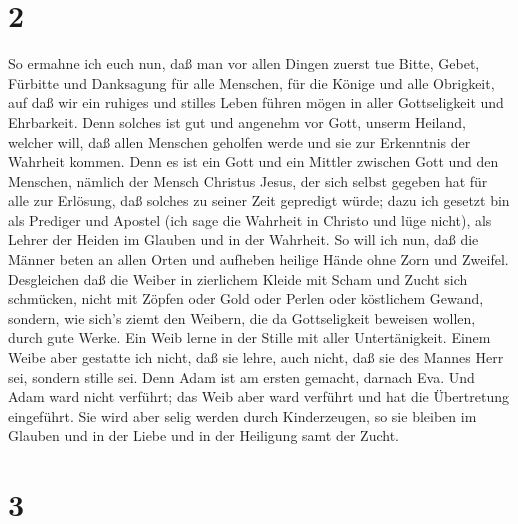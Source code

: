 \hypertarget{section-1}{%
\section{2}\label{section-1}}

 So ermahne ich euch nun, daß man vor allen Dingen zuerst
tue Bitte, Gebet, Fürbitte und Danksagung für alle Menschen,
 für die Könige und alle Obrigkeit, auf daß wir ein ruhiges
und stilles Leben führen mögen in aller Gottseligkeit und Ehrbarkeit.
 Denn solches ist gut und angenehm vor Gott, unserm Heiland,
 welcher will, daß allen Menschen geholfen werde und sie zur
Erkenntnis der Wahrheit kommen.  Denn es ist ein Gott und
ein Mittler zwischen Gott und den Menschen, nämlich der Mensch Christus
Jesus,  der sich selbst gegeben hat für alle zur Erlösung,
daß solches zu seiner Zeit gepredigt würde;  dazu ich
gesetzt bin als Prediger und Apostel (ich sage die Wahrheit in Christo
und lüge nicht), als Lehrer der Heiden im Glauben und in der Wahrheit.
 So will ich nun, daß die Männer beten an allen Orten und
aufheben heilige Hände ohne Zorn und Zweifel.  Desgleichen
daß die Weiber in zierlichem Kleide mit Scham und Zucht sich schmücken,
nicht mit Zöpfen oder Gold oder Perlen oder köstlichem Gewand,
 sondern, wie sich's ziemt den Weibern, die da
Gottseligkeit beweisen wollen, durch gute Werke.  Ein Weib
lerne in der Stille mit aller Untertänigkeit.  Einem Weibe
aber gestatte ich nicht, daß sie lehre, auch nicht, daß sie des Mannes
Herr sei, sondern stille sei.  Denn Adam ist am ersten
gemacht, darnach Eva.  Und Adam ward nicht verführt; das
Weib aber ward verführt und hat die Übertretung eingeführt.
 Sie wird aber selig werden durch Kinderzeugen, so sie
bleiben im Glauben und in der Liebe und in der Heiligung samt der Zucht.

\hypertarget{section-2}{%
\section{3}\label{section-2}}

